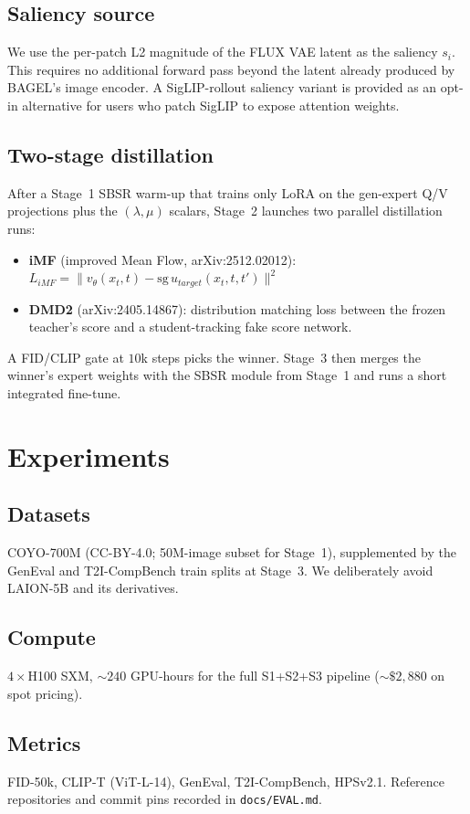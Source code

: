\documentclass[10pt,letterpaper]{article}
\begin{document}
\subsection{Saliency source}
We use the per-patch L2 magnitude of the FLUX VAE latent as the
saliency $s_i$. This requires no additional forward pass beyond the
latent already produced by BAGEL's image encoder. A SigLIP-rollout
saliency variant is provided as an opt-in alternative for users who
patch SigLIP to expose attention weights.

\subsection{Two-stage distillation}
After a Stage~1 SBSR warm-up that trains only LoRA on the gen-expert
Q/V projections plus the $(\lambda, \mu)$ scalars, Stage~2 launches two
parallel distillation runs:
\begin{itemize}
  \item \textbf{iMF} (improved Mean Flow, arXiv:2512.02012):
    $L_{iMF} = \|v_\theta(x_t, t) - \mathrm{sg}\,u_{target}(x_t, t, t')\|^2$
  \item \textbf{DMD2} (arXiv:2405.14867):
    distribution matching loss between the frozen teacher's score and a
    student-tracking fake score network.
\end{itemize}
A FID/CLIP gate at $10$k steps picks the winner. Stage~3 then merges
the winner's expert weights with the SBSR module from Stage~1 and runs
a short integrated fine-tune.

\section{Experiments}

\subsection{Datasets}
COYO-700M (CC-BY-4.0; 50M-image subset for Stage~1), supplemented by
the GenEval and T2I-CompBench train splits at Stage~3. We deliberately
avoid LAION-5B and its derivatives.

\subsection{Compute}
$4\times$H100 SXM, $\sim 240$ GPU-hours for the full S1+S2+S3 pipeline
($\sim\$2{,}880$ on spot pricing).

\subsection{Metrics}
FID-50k, CLIP-T (ViT-L-14), GenEval, T2I-CompBench, HPSv2.1.
Reference repositories and commit pins recorded in
\texttt{docs/EVAL.md}.
\end{document}
